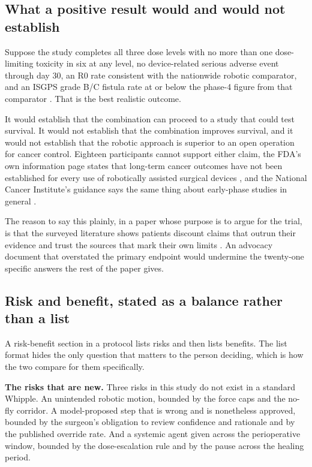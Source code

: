 \subsection{What a positive result would and would not establish}

Suppose the study completes all three dose levels with no more than one
dose-limiting toxicity in six at any level, no device-related serious adverse
event through day 30, an R0 rate consistent with the nationwide robotic
comparator, and an ISGPS grade B/C fistula rate at or below the phase-4 figure
from that comparator \cite{DutchCohort2025}. That is the best realistic outcome.

It would establish that the combination can proceed to a study that could test
survival. It would not establish that the combination improves survival, and it
would not establish that the robotic approach is superior to an open operation
for cancer control. Eighteen participants cannot support either claim, the FDA's
own information page states that long-term cancer outcomes have not been
established for every use of robotically assisted surgical devices
\cite{FDARobot2022}, and the National Cancer Institute's guidance says the same
thing about early-phase studies in general \cite{NCITrial2024}.

The reason to say this plainly, in a paper whose purpose is to argue for the
trial, is that the surveyed literature shows patients discount claims that
outrun their evidence and trust the sources that mark their own limits
\cite{Jauniaux2025}. An advocacy document that overstated the primary endpoint
would undermine the twenty-one specific answers the rest of the paper gives.

\subsection{Risk and benefit, stated as a balance rather than a list}

A risk-benefit section in a protocol lists risks and then lists benefits. The
list format hides the only question that matters to the person deciding, which
is how the two compare for them specifically.

\textbf{The risks that are new.} Three risks in this study do not exist in a
standard Whipple. An unintended robotic motion, bounded by the force caps and
the no-fly corridor. A model-proposed step that is wrong and is nonetheless
approved, bounded by the surgeon's obligation to review confidence and rationale
and by the published override rate. And a systemic agent given across the
perioperative window, bounded by the dose-escalation rule and by the pause
across the healing period.

